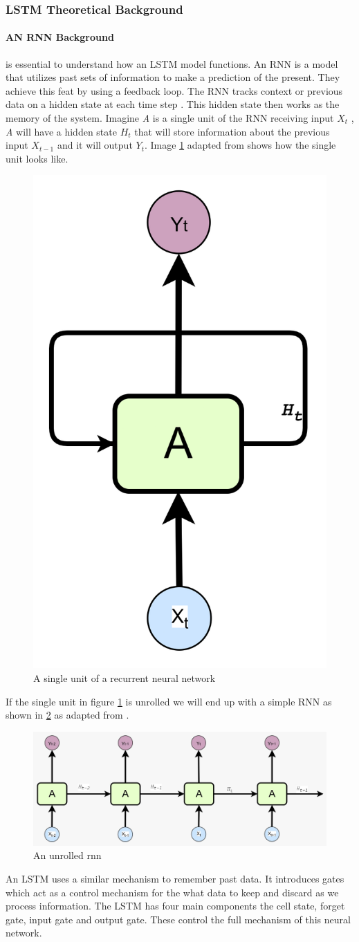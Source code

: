 \subsubsection{LSTM Theoretical Background \label{sec:lstm_background}}
 
\paragraph{AN RNN Background} is essential to understand how an LSTM model functions. An RNN is a model that utilizes past sets of information to make a prediction of the present. They achieve this feat by using a feedback loop. The RNN tracks context or previous data on a hidden state at each time step \cite{stryker_ibm_rnn}. This hidden state then works as the memory of the system. 
Imagine \textit{A} is a single unit of the RNN receiving input \textit{$X_t$} , \textit{A} will have a  hidden state \textit{$H_t$} that will store information about the previous input $X_{t-1}$ and it will output \textit{$Y_t$}. Image \ref{fig:rnnsingleunit} adapted from \cite{colah2015understanding} shows how the single unit looks like.

\begin{figure}[h]
	\centering
	\includegraphics[width=0.1\linewidth]{Chapters/images/rnn_singleunit}
	\caption{A single unit of a recurrent neural network}
	\label{fig:rnnsingleunit}
\end{figure}
If the single unit in figure \ref{fig:rnnsingleunit} is unrolled we will end up with a simple RNN as shown in \ref{fig:unrolledrnn} as adapted from \cite{colah2015understanding}.

\begin{figure}[H]
	\centering
	\includegraphics[width=0.5\linewidth,height=0.1\textheight]{Chapters/images/unrolled_rnn.jpeg}
	\caption{An unrolled rnn}
	\label{fig:unrolledrnn}
\end{figure}

An LSTM uses a similar mechanism  to remember past data. It introduces  gates which act as a control mechanism for the what data to keep and discard as we process information. The LSTM has four main components the cell state, forget gate, input gate and output gate. These control the full mechanism of this neural network.

